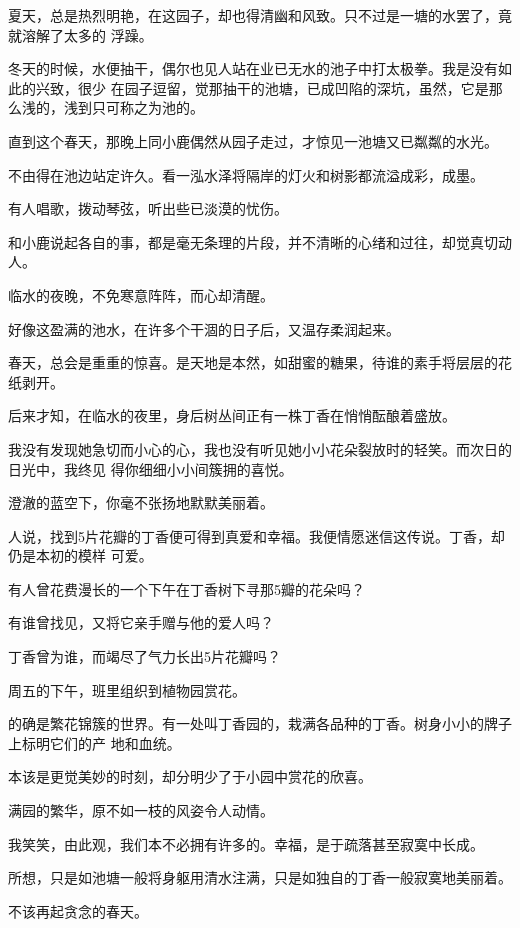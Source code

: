 		夏天，总是热烈明艳，在这园子，却也得清幽和风致。只不过是一塘的水罢了，竟就溶解了太多的
	浮躁。

		冬天的时候，水便抽干，偶尔也见人站在业已无水的池子中打太极拳。我是没有如此的兴致，很少
	在园子逗留，觉那抽干的池塘，已成凹陷的深坑，虽然，它是那么浅的，浅到只可称之为池的。

		直到这个春天，那晚上同小鹿偶然从园子走过，才惊见一池塘又已粼粼的水光。

		不由得在池边站定许久。看一泓水泽将隔岸的灯火和树影都流溢成彩，成墨。

		有人唱歌，拨动琴弦，听出些已淡漠的忧伤。

		和小鹿说起各自的事，都是毫无条理的片段，并不清晰的心绪和过往，却觉真切动人。

		临水的夜晚，不免寒意阵阵，而心却清醒。

		好像这盈满的池水，在许多个干涸的日子后，又温存柔润起来。

		春天，总会是重重的惊喜。是天地是本然，如甜蜜的糖果，待谁的素手将层层的花纸剥开。

		后来才知，在临水的夜里，身后树丛间正有一株丁香在悄悄酝酿着盛放。

		我没有发现她急切而小心的心，我也没有听见她小小花朵裂放时的轻笑。而次日的日光中，我终见
	得你细细小小间簇拥的喜悦。

		澄澈的蓝空下，你毫不张扬地默默美丽着。

		人说，找到5片花瓣的丁香便可得到真爱和幸福。我便情愿迷信这传说。丁香，却仍是本初的模样
	可爱。

		有人曾花费漫长的一个下午在丁香树下寻那5瓣的花朵吗？

		有谁曾找见，又将它亲手赠与他的爱人吗？

		丁香曾为谁，而竭尽了气力长出5片花瓣吗？

		周五的下午，班里组织到植物园赏花。

		的确是繁花锦簇的世界。有一处叫丁香园的，栽满各品种的丁香。树身小小的牌子上标明它们的产
	地和血统。

		本该是更觉美妙的时刻，却分明少了于小园中赏花的欣喜。

		满园的繁华，原不如一枝的风姿令人动情。

		我笑笑，由此观，我们本不必拥有许多的。幸福，是于疏落甚至寂寞中长成。

		所想，只是如池塘一般将身躯用清水注满，只是如独自的丁香一般寂寞地美丽着。

		不该再起贪念的春天。

	\endwriting



